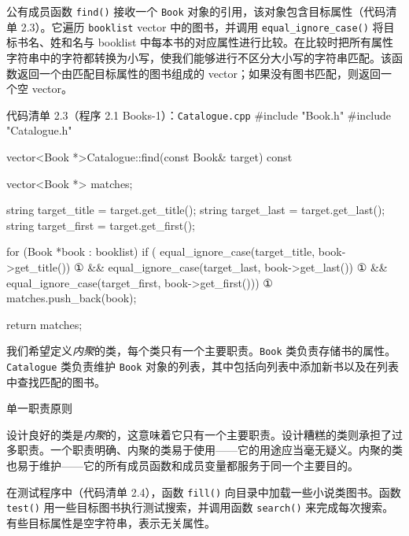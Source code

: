 公有成员函数 \texttt{find()} 接收一个 \texttt{Book} 对象的引用，该对象包含目标属性（代码清单 2.3）。它遍历 \texttt{booklist} vector 中的图书，并调用 \texttt{equal\_\allowbreak{}ignore\_\allowbreak{}case(\allowbreak{})\allowbreak{}} 将目标书名、姓和名与 booklist 中每本书的对应属性进行比较。在比较时把所有属性字符串中的字符都转换为小写，使我们能够进行不区分大小写的字符串匹配。该函数返回一个由匹配目标属性的图书组成的 vector；如果没有图书匹配，则返回一个空 vector。

\begin{codeboxt}{代码清单 2.3（程序 2.1 Books-1）：\texttt{Catalogue.\allowbreak{}cpp}}
#include "Book.h"
#include "Catalogue.h"

vector<Book *>Catalogue::find(const Book& target) const
{
    vector<Book *> matches;

    string target_title = target.get_title();
    string target_last  = target.get_last();
    string target_first = target.get_first();

    for (Book *book : booklist)
    {
        if (    equal_ignore_case(target_title, book->get_title())      ①
             && equal_ignore_case(target_last,  book->get_last())       ①
             && equal_ignore_case(target_first, book->get_first()))     ①
        {
            matches.push_back(book);
        }
    }

    return matches;
}
\end{codeboxt}
\par

我们希望定义\emph{内聚}的类，每个类只有一个主要职责。\texttt{Book} 类负责存储书的属性。\texttt{Catalogue} 类负责维护 \texttt{Book} 对象的列表，其中包括向列表中添加新书以及在列表中查找匹配的图书。

\begin{mySidebar}{单一职责原则}

设计良好的类是\emph{内聚}的，这意味着它只有一个主要职责。设计糟糕的类则承担了过多职责。一个职责明确、内聚的类易于使用——它的用途应当毫无疑义。内聚的类也易于维护——它的所有成员函数和成员变量都服务于同一个主要目的。
\end{mySidebar}

在测试程序中（代码清单 2.4），函数 \texttt{fill()} 向目录中加载一些小说类图书。函数 \texttt{test()} 用一些目标图书执行测试搜索，并调用函数 \texttt{search()} 来完成每次搜索。有些目标属性是空字符串，表示无关属性。

